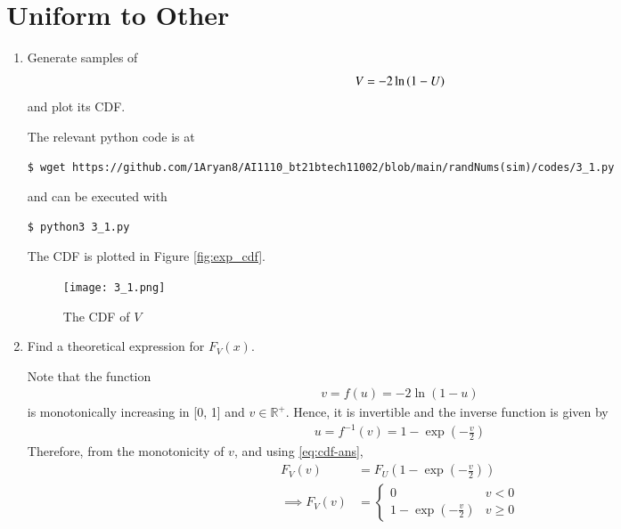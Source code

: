 \documentclass[journal,12pt,twocolumn]{IEEEtran}
\renewcommand\thesection{\arabic{section}}
\begin{document}
\section{Uniform to Other}
\begin{enumerate}[label=\thesection.\arabic*
,ref=\thesection.\theenumi]

%
\item
Generate samples of 
%
\begin{equation}
V = -2\ln\left(1-U\right)
\end{equation}
%
and plot its CDF.

\solution
The relevant python code is at
\begin{lstlisting}
$ wget https://github.com/1Aryan8/AI1110_bt21btech11002/blob/main/randNums(sim)/codes/3_1.py
\end{lstlisting}
and can be executed with
\begin{lstlisting}
$ python3 3_1.py
\end{lstlisting}
The CDF is plotted in Figure \eqref{fig:exp_cdf}.
\begin{figure}[!htb] 
\centering
\texttt{[image: 3\_1.png]}
\caption{The CDF of $V$}
\label{fig:exp_cdf}
\end{figure}

\item Find a theoretical expression for $F_V(x)$.

\solution
Note that the function 
		\begin{align}
			v = f(u) = -2\ln{(1 - u)}
		\end{align}
is monotonically increasing in [0, 1] and $v \in \mathbb{R^+}$. Hence, it is invertible and the inverse function is given by
		\begin{align}
			u = f^{-1}(v) = 1 - \exp{\left(-\frac{v}{2}\right)}
		\end{align}
		Therefore, from the monotonicity of $v$, and using \eqref{eq:cdf-ans},
		\begin{align}
			F_V(v) &= F_U\left(1 - \exp{\left(-\frac{v}{2}\right)}\right) \\
			\implies F_V(v) &= 
			\begin{cases}
				0 & v < 0 \\
				1 - \exp{\left(-\frac{v}{2}\right)} & v \geq 0
			\end{cases}
			\label{eq:f-v}
		\end{align}
%

\end{enumerate}
\end{document}
